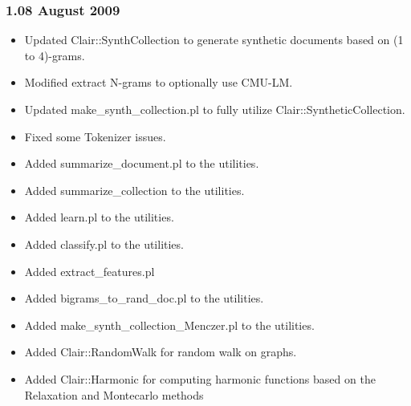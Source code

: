 \subsubsection*{1.08 August 2009\label{1_08_August_2009}}
\begin{itemize}

\item 

Updated Clair::SynthCollection to generate synthetic documents based on (1 to 4)-grams.


\item 

Modified extract N-grams to optionally use CMU-LM.


\item 

Updated make\_synth\_collection.pl to fully utilize Clair::SyntheticCollection.


\item 

Fixed some Tokenizer issues.


\item 

Added summarize\_document.pl to the utilities.


\item 

Added summarize\_collection to the utilities.


\item 

Added learn.pl to the utilities.


\item 

Added classify.pl to the utilities.


\item 

Added extract\_features.pl


\item 

Added bigrams\_to\_rand\_doc.pl to the utilities.


\item 

Added make\_synth\_collection\_Menczer.pl to the utilities.


\item 

Added Clair::RandomWalk for random walk on graphs.


\item 

Added Clair::Harmonic for computing harmonic functions based on the Relaxation and Montecarlo methods



\end{itemize}
